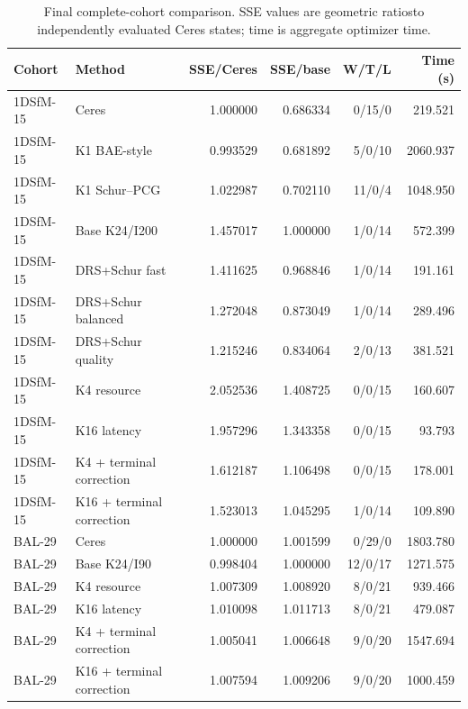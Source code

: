 \begin{table}[t]
  \centering
  \caption{Final complete-cohort comparison. SSE values are geometric ratios\newline to independently evaluated Ceres states; time is aggregate optimizer time.}
  \label{tab:stage-c-final-reference}
  \scriptsize
  \begin{tabular}{llrrrr}
    \hline
    Cohort & Method & SSE/Ceres & SSE/base & W/T/L & Time (s) \\
    \hline
    1DSfM-15 & Ceres & 1.000000 & 0.686334 & 0/15/0 & 219.521 \\
    1DSfM-15 & K1 BAE-style & 0.993529 & 0.681892 & 5/0/10 & 2060.937 \\
    1DSfM-15 & K1 Schur--PCG & 1.022987 & 0.702110 & 11/0/4 & 1048.950 \\
    1DSfM-15 & Base K24/I200 & 1.457017 & 1.000000 & 1/0/14 & 572.399 \\
    1DSfM-15 & DRS+Schur fast & 1.411625 & 0.968846 & 1/0/14 & 191.161 \\
    1DSfM-15 & DRS+Schur balanced & 1.272048 & 0.873049 & 1/0/14 & 289.496 \\
    1DSfM-15 & DRS+Schur quality & 1.215246 & 0.834064 & 2/0/13 & 381.521 \\
    1DSfM-15 & K4 resource & 2.052536 & 1.408725 & 0/0/15 & 160.607 \\
    1DSfM-15 & K16 latency & 1.957296 & 1.343358 & 0/0/15 & 93.793 \\
    1DSfM-15 & K4 + terminal correction & 1.612187 & 1.106498 & 0/0/15 & 178.001 \\
    1DSfM-15 & K16 + terminal correction & 1.523013 & 1.045295 & 1/0/14 & 109.890 \\
    BAL-29 & Ceres & 1.000000 & 1.001599 & 0/29/0 & 1803.780 \\
    BAL-29 & Base K24/I90 & 0.998404 & 1.000000 & 12/0/17 & 1271.575 \\
    BAL-29 & K4 resource & 1.007309 & 1.008920 & 8/0/21 & 939.466 \\
    BAL-29 & K16 latency & 1.010098 & 1.011713 & 8/0/21 & 479.087 \\
    BAL-29 & K4 + terminal correction & 1.005041 & 1.006648 & 9/0/20 & 1547.694 \\
    BAL-29 & K16 + terminal correction & 1.007594 & 1.009206 & 9/0/20 & 1000.459 \\
    \hline
  \end{tabular}
\end{table}
